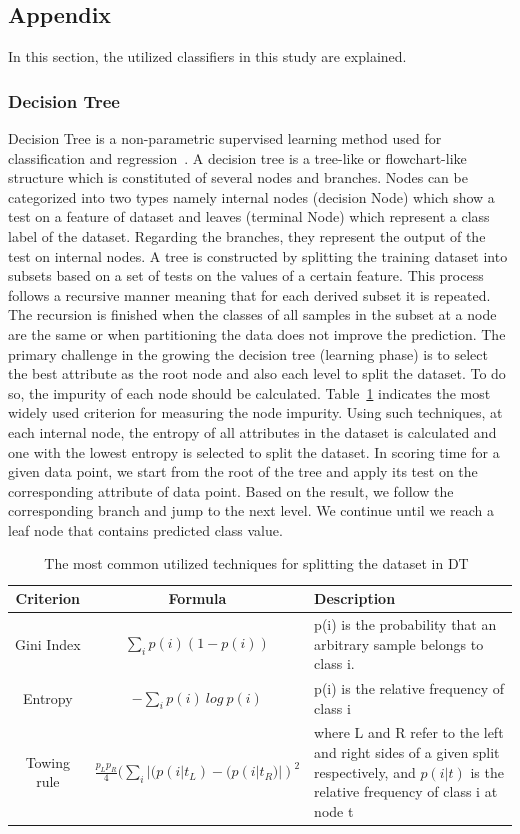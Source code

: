 \subsection{Appendix} \label{sec:appendix}
In this section, the utilized classifiers in this study are explained.

\subsubsection{Decision Tree}
Decision Tree is a non-parametric supervised learning method used for classification and regression~\citep{duda2012pattern}. A decision tree is a tree-like or flowchart-like structure which is constituted of several nodes and branches. Nodes can be categorized into two types namely internal nodes (decision Node) which show a test on a feature of dataset and leaves (terminal Node) which represent a class label of the dataset. Regarding the branches, they represent the output of the test on internal nodes. A tree is constructed by splitting the training dataset into subsets based on a set of tests on the values of a certain feature. This process follows a recursive manner meaning that for each derived subset it is repeated. The recursion is finished when the classes of all samples in the subset at a node are the same or when partitioning the data does not improve the prediction. The primary challenge in the growing the decision tree (learning phase) is to select the best attribute as the root node and also each level to split the dataset. To do so, the impurity of each node should be calculated. Table~\ref{tab:dt_criterion} indicates the most widely used criterion for measuring the node impurity. Using such techniques, at each internal node, the entropy of all attributes in the dataset is calculated and one with the lowest entropy is selected to split the dataset. In scoring time for a given data point, we start from the root of the tree and apply its test on the corresponding attribute of data point. Based on the result, we follow the corresponding branch and jump to the next level. We continue until we reach a leaf node that contains predicted class value.   


\begin{table}[h]
    \centering
\begin{tabular}{|c|c|>{\centering}m{5cm}|}
\hline 
Criterion & Formula &Description \tabularnewline
\hline 
\hline 
Gini Index & $\sum_{i} p(i)(1-p(i))$ & p(i) is the probability
that an arbitrary
sample belongs to
class i.\tabularnewline
\hline 
Entropy & $-\sum_{i} p(i)~log~p(i)$ & p(i) is the relative frequency of class i\tabularnewline
\hline 
Towing rule & $\frac{p_{L} p_{R}}{4}(\sum_{i}|(p(i|t_L) - (p(i|t_R)|)^2$ & where L and R
refer to the left and right sides of a given split respectively, and 
$p(i|t)$ is the relative frequency of class i at node t \tabularnewline
\hline 
\end{tabular}
    \caption{The most common utilized techniques for splitting the dataset in DT~\citep{zambon2006effect} }
    \label{tab:dt_criterion}
\end{table}



